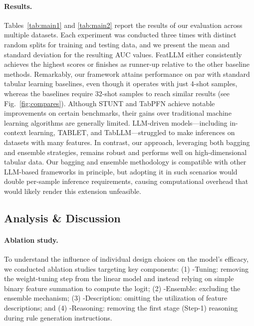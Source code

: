 \vspace*{-0.12in}
\paragraph{Results.}
Tables~\ref{tab:main1} and \ref{tab:main2} report the results of our evaluation across multiple datasets. Each experiment was conducted three times with distinct random splits for training and testing data, and we present the mean and standard deviation for the resulting AUC values. \textsf{FeatLLM} either consistently achieves the highest scores or finishes as runner-up relative to the other baseline methods. Remarkably, our framework attains performance on par with standard tabular learning baselines, even though it operates with just 4-shot samples, whereas the baselines require 32-shot samples to reach similar results (see Fig.~\ref{fig:compares}). Although STUNT and TabPFN achieve notable improvements on certain benchmarks, their gains over traditional machine learning algorithms are generally limited. LLM-driven models—including in-context learning, TABLET, and TabLLM—struggled to make inferences on datasets with many features. In contrast, our approach, leveraging both bagging and ensemble strategies, remains robust and performs well on high-dimensional tabular data. Our bagging and ensemble methodology is compatible with other LLM-based frameworks in principle, but adopting it in such scenarios would double per-sample inference requirements, causing computational overhead that would likely render this extension unfeasible.

\subsection{Analysis \& Discussion}
\label{sec:analysis}
\paragraph{Ablation study.} To understand the influence of individual design choices on the model’s efficacy, we conducted ablation studies targeting key components: (1) \textsf{-Tuning}: removing the weight-tuning step from the linear model and instead relying on simple binary feature summation to compute the logit; (2) \textsf{-Ensemble}: excluding the ensemble mechanism; (3) \textsf{-Description}: omitting the utilization of feature descriptions; and (4) \textsf{-Reasoning}: removing the first stage (Step-1) reasoning during rule generation instructions.

